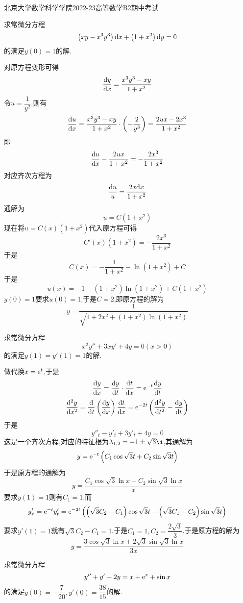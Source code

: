\documentclass{ctexart}
\begin{document}
\pagestyle{empty}
\begin{center}\Large
    北京大学数学科学学院2022-23高等数学B2期中考试
\end{center}
\begin{problem}[1.(10\songti{分})]
    求常微分方程
    \[\left(xy-x^3y^3\right)\mathrm{d} x+\left(1+x^2\right)\mathrm{d} y=0\]
    的满足$y(0)=1$的解.
\end{problem}
\begin{solution}
    对原方程变形可得
    \[\dfrac{\mathrm{d} y}{\mathrm{d} x}=\dfrac{x^3y^3-xy}{1+x^2}\]
    令$u=\dfrac{1}{y^2}$,则有
    \[\dfrac{\mathrm{d} u}{\mathrm{d} x}=\dfrac{x^3y^3-xy}{1+x^2}\cdot\left(-\dfrac{2}{y^3}\right)=\dfrac{2ux-2x^3}{1+x^2}\]
    即
    \[\dfrac{\mathrm{d} u}{\mathrm{d} x}-\dfrac{2ux}{1+x^2}=-\dfrac{2x^3}{1+x^2}\]
    对应齐次方程为
    \[\dfrac{\mathrm{d} u}{u}=\dfrac{2x\mathrm{d} x}{1+x^2}\]
    通解为
    \[u=C(1+x^2)\]
    现在将$u=C(x)\left(1+x^2\right)$代入原方程可得
    \[C'(x)\left(1+x^2\right)=-\dfrac{2x^3}{1+x^2}\]
    于是
    \[C(x)=-\dfrac{1}{1+x^2}-\ln(1+x^2)+C\]
    于是
    \[u(x)=-1-\left(1+x^2\right)\ln(1+x^2)+C\left(1+x^2\right)\]
    $y(0)=1$要求$u(0)=1$,于是$C=2$,即原方程的解为
    \[y=\dfrac{1}{\sqrt{1+2x^2+\left(1+x^2\right)\ln\left(1+x^2\right)}}\]
\end{solution}
\begin{problem}[2.(10\songti{分})]
    求常微分方程
    \[x^2y''+3xy'+4y=0(x>0)\]
    的满足$y(1)=y'(1)=1$的解.
\end{problem}
\begin{solution}
    做代换$x=\mathrm{e}^t$,于是
    \[\dfrac{\mathrm{d} y}{\mathrm{d} x}=\dfrac{\mathrm{d} y}{\mathrm{d} t}\cdot\dfrac{\mathrm{d} t}{\mathrm{d} x}=\mathrm{e}^{-t}\dfrac{\mathrm{d} y}{\mathrm{d} t}\]
    \[\dfrac{\mathrm{d}^2y}{\mathrm{d} x^2}=\dfrac{\mathrm{d}}{\mathrm{d} t}\left(\dfrac{\mathrm{d} y}{\mathrm{d} x}\right)\dfrac{\mathrm{d} t}{\mathrm{d} x}=\mathrm{e}^{-2t}\left(\dfrac{\mathrm{d}^2y}{\mathrm{d} t^2}-\dfrac{\mathrm{d} y}{\mathrm{d} t}\right)\]
    于是
    \[y''_t-y'_t+3y'_t+4y=0\]
    这是一个齐次方程,对应的特征根为$\lambda_{1,2}=-1\pm\sqrt3\i$,其通解为
    \[y=\mathrm{e}^{-t}\left(C_1\cos\sqrt3t+C_2\sin\sqrt3t\right)\]
    于是原方程的通解为
    \[y=\dfrac{C_1\cos\sqrt3\ln x+C_2\sin\sqrt3\ln x}{x}\]
    要求$y(1)=1$则有$C_1=1$.而
    \[y'_x=\mathrm{e}^{-t}y'_t=\mathrm{e}^{-2t}\left(\left(\sqrt3C_2-C_1\right)\cos\sqrt3t-\left(\sqrt3C_1+C_2\right)\sin\sqrt3t\right)\]
    要求$y'(1)=1$就有$\sqrt3C_2-C_1=1$.于是$C_1=1,C_2=\dfrac{2\sqrt3}{3}$,于是原方程的解为
    \[y=\dfrac{3\cos\sqrt3\ln x+2\sqrt{3}\sin\sqrt3\ln x}{3x}\]
\end{solution}
\begin{problem}[3.(10\songti{分})]
    求常微分方程
    \[y''+y'-2y=x+\mathrm{e}^x+\sin x\]
    的满足$y(0)=-\dfrac{7}{20},y'(0)=\dfrac{38}{15}$的解.
\end{problem}
\end{document}
